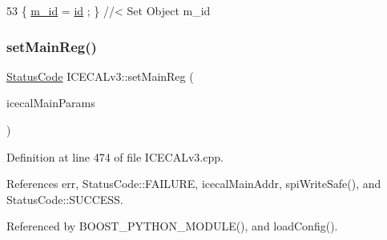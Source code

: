 \begin{DoxyCode}
53 \{ \hyperlink{classObject_aca74b9dbfed7b5556ea2d56c65b6b6b0}{m\_id}    = \hyperlink{classObject_af99145335cc61ff6e2798ea17db009d2}{id}    ; \} \textcolor{comment}{//< Set Object m\_id}
\end{DoxyCode}
\mbox{\label{classICECALv3_a479f7e17669da4b785af840049d39cb4}} 
\subsubsection{\texorpdfstring{set\+Main\+Reg()}{setMainReg()}}
{\footnotesize\ttfamily \hyperlink{classStatusCode}{Status\+Code} I\+C\+E\+C\+A\+Lv3\+::set\+Main\+Reg (\begin{DoxyParamCaption}\item[{Py\+Object $\ast$}]{icecal\+Main\+Params }\end{DoxyParamCaption})}



Definition at line 474 of file I\+C\+E\+C\+A\+Lv3.\+cpp.



References err, Status\+Code\+::\+F\+A\+I\+L\+U\+RE, icecal\+Main\+Addr, spi\+Write\+Safe(), and Status\+Code\+::\+S\+U\+C\+C\+E\+SS.



Referenced by B\+O\+O\+S\+T\+\_\+\+P\+Y\+T\+H\+O\+N\+\_\+\+M\+O\+D\+U\+L\+E(), and load\+Config().


